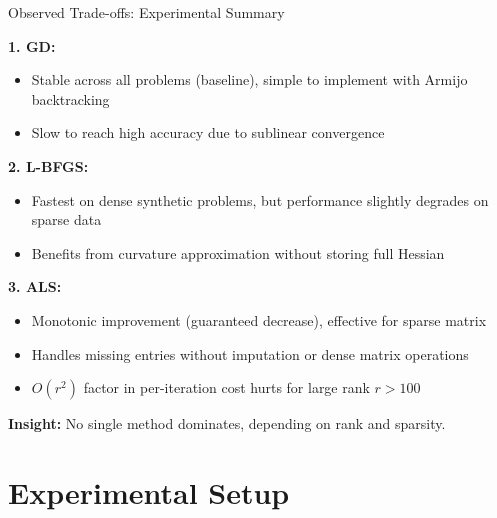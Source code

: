 \documentclass[aspectratio=169,usenames,dvipsnames]{beamer}
\begin{document}
\begin{frame}{Observed Trade-offs: Experimental Summary}

\textbf{1. GD:}
    \begin{itemize}
        \item Stable across all problems (baseline), simple to implement with Armijo backtracking
        \item Slow to reach high accuracy due to sublinear convergence
    \end{itemize}

        \vspace{0.15cm}
        
\textbf{2. L-BFGS:} 
    \begin{itemize}
        \item Fastest on dense synthetic problems, but performance slightly degrades on sparse data
        \item Benefits from curvature approximation without storing full Hessian
    \end{itemize}
    
    \vspace{0.15cm}
    
    \textbf{3. ALS:}
    \begin{itemize}
        \item Monotonic improvement (guaranteed decrease), effective for sparse matrix
        \item Handles missing entries without imputation or dense matrix operations
        \item $O(r^2)$ factor in per-iteration cost hurts for large rank $r > 100$
    \end{itemize}

\vspace{0.25cm}
\textbf{Insight:} No single method dominates, depending on rank and sparsity.

\end{frame}

\section{Experimental Setup}
\end{document}
